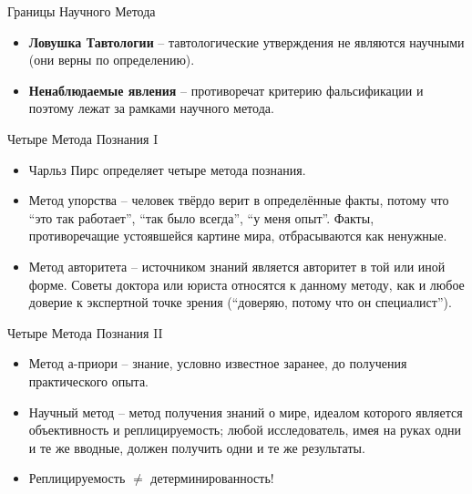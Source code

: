 \documentclass{beamer}
\begin{document}
\begin{frame}{Границы Научного Метода}
\begin{itemize}
	\setlength\itemsep{2em}
	\item \textbf{Ловушка Тавтологии} -- тавтологические утверждения не являются научными (они верны по определению).  
	\item \textbf{Ненаблюдаемые явления} -- противоречат критерию фальсификации и поэтому лежат за рамками научного метода. 
\end{itemize}
\end{frame}
\begin{frame}{Четыре Метода Познания I}
\begin{itemize}
	\setlength\itemsep{2em}
	\item Чарльз Пирс определяет четыре метода познания.
	\item Метод упорства -- человек твёрдо верит в определённые факты,  потому что  ``это так работает'', ``так было всегда'',  ``у меня опыт''.  Факты,  противоречащие устоявшейся картине мира,  отбрасываются как ненужные. 
	\item Метод авторитета -- источником знаний является авторитет в той или иной форме.  Советы доктора или юриста относятся к данному методу,  как и любое доверие к экспертной точке зрения (``доверяю,  потому что он специалист''). 
\end{itemize}
\end{frame}
\begin{frame}{Четыре Метода Познания II}
\begin{itemize}
	\setlength\itemsep{2em}
	\item Метод а-приори -- знание,  условно известное заранее,  до получения практического опыта. 
	\item Научный метод -- метод получения знаний о мире,  идеалом которого является объективность и реплицируемость; любой исследователь,  имея на руках одни и те же вводные,  должен получить одни и те же результаты.  
	\item Реплицируемость $\neq$ детерминированность! 
\end{itemize}
\end{frame}
\end{document}
